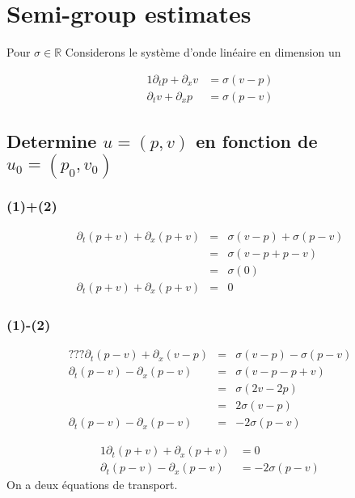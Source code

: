 \documentclass[a4paper,11pt]{article}
\begin{document}
\section{Semi-group estimates}
Pour \( \sigma \in \mathbb{R} \)
Considerons le système d'onde linéaire en dimension un

\begin{alignat}{1}
    \partial_{t}p + \partial_{x}v &= \sigma(v-p) \\
    \partial_{t}v + \partial_{x}p &= \sigma(p-v)
\end{alignat}

\subsection{Determine \( u = (p, v) \) en fonction de \( u_{0} = (p_{0}, v_{0}) \)}
\subsubsection*{(1)+(2)}

\begin{equation*}
    \begin{array}{rcl}
        \partial_{t}(p+v) + \partial_{x}(p+v) &=& \sigma(v-p) + \sigma(p-v) \\
        &=& \sigma(v-p + p-v) \\
        &=& \sigma(0) \\
        \partial_{t}(p+v) + \partial_{x}(p+v) &=& 0
    \end{array}
\end{equation*}

\subsubsection*{(1)-(2)}

\begin{equation*}
\begin{array}{rcl}
    ???\partial_{t}(p-v) + \partial_{x}(v-p) &=& \sigma(v-p) - \sigma(p-v) \\
    \partial_{t}(p-v) - \partial_{x}(p-v) &=& \sigma(v-p - p+v) \\    
    &=& \sigma(2v-2p) \\
    &=& 2\sigma(v-p) \\
    \partial_{t}(p-v) - \partial_{x}(p-v) &=& -2\sigma(p-v)
\end{array}
\end{equation*}

\begin{alignat}{1}
    \partial_{t}(p+v) + \partial_{x}(p+v) &= 0 \\
    \partial_{t}(p-v) - \partial_{x}(p-v) &= -2\sigma(p-v)
\end{alignat}
On a deux équations de transport. \\
\end{document}
